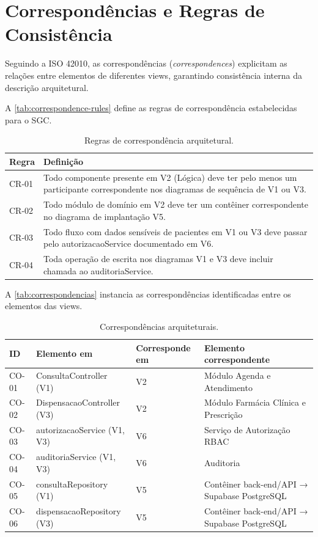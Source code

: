 \section{Correspondências e Regras de Consistência}

Seguindo a ISO 42010, as correspondências (\textit{correspondences}) explicitam as relações entre elementos de diferentes views, garantindo consistência interna da descrição arquitetural.

A \autoref{tab:correspondence-rules} define as regras de correspondência estabelecidas para o SGC.

\begin{table}[htbp]
\caption{Regras de correspondência arquitetural.}
\label{tab:correspondence-rules}
\centering
\small
\begin{tabularx}{\textwidth}{|l|X|}
\hline
\textbf{Regra} & \textbf{Definição} \\
\hline
CR-01 & Todo componente presente em V2 (Lógica) deve ter pelo menos um participante correspondente nos diagramas de sequência de V1 ou V3. \\
CR-02 & Todo módulo de domínio em V2 deve ter um contêiner correspondente no diagrama de implantação V5. \\
CR-03 & Todo fluxo com dados sensíveis de pacientes em V1 ou V3 deve passar pelo autorizacaoService documentado em V6. \\
CR-04 & Toda operação de escrita nos diagramas V1 e V3 deve incluir chamada ao auditoriaService. \\
\hline
\end{tabularx}
\end{table}

A \autoref{tab:correspondencias} instancia as correspondências identificadas entre os elementos das views.

\begin{table}[htbp]
\caption{Correspondências arquiteturais.}
\label{tab:correspondencias}
\centering
\small
\begin{tabularx}{\textwidth}{|l|l|l|X|}
\hline
\textbf{ID} & \textbf{Elemento em} & \textbf{Corresponde em} & \textbf{Elemento correspondente} \\
\hline
CO-01 & ConsultaController (V1) & V2 & Módulo Agenda e Atendimento \\
CO-02 & DispensacaoController (V3) & V2 & Módulo Farmácia Clínica e Prescrição \\
CO-03 & autorizacaoService (V1, V3) & V6 & Serviço de Autorização RBAC \\
CO-04 & auditoriaService (V1, V3) & V6 & Auditoria \\
CO-05 & consultaRepository (V1) & V5 & Contêiner back-end/API → Supabase PostgreSQL \\
CO-06 & dispensacaoRepository (V3) & V5 & Contêiner back-end/API → Supabase PostgreSQL \\
\hline
\end{tabularx}
\end{table}

